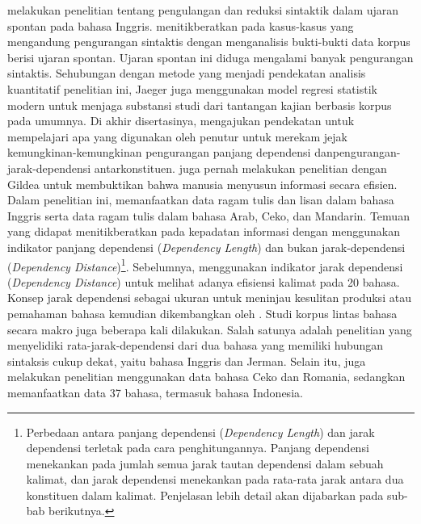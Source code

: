 \cite{jaeger2006redundancy} melakukan penelitian tentang pengulangan dan reduksi sintaktik dalam ujaran spontan pada bahasa Inggris. \cite{jaeger2006redundancy} menitikberatkan pada kasus-kasus yang mengandung pengurangan sintaktis dengan menganalisis bukti-bukti data korpus berisi ujaran spontan. Ujaran spontan ini diduga mengalami banyak pengurangan sintaktis. Sehubungan dengan metode yang menjadi pendekatan analisis kuantitatif penelitian ini, Jaeger juga menggunakan model regresi statistik modern untuk menjaga substansi studi dari tantangan kajian berbasis korpus pada umumnya. Di akhir disertasinya, \cite{jaeger2006redundancy} mengajukan pendekatan untuk mempelajari apa yang digunakan oleh penutur untuk merekam jejak kemungkinan-kemungkinan pengurangan panjang dependensi dan\gls{pengurangan-jarak-dependensi} antarkonstituen. \cite{jaeger2006redundancy} juga pernah melakukan penelitian dengan Gildea \citep{gildea2015human} untuk membuktikan bahwa manusia menyusun informasi secara efisien. Dalam penelitian ini, \cite{gildea2015human} memanfaatkan data ragam tulis dan lisan dalam bahasa Inggris serta data ragam tulis dalam bahasa Arab, Ceko, dan Mandarin. Temuan yang didapat menitikberatkan pada kepadatan informasi dengan menggunakan indikator panjang dependensi (\textit{Dependency Length}) dan bukan \gls{jarak-dependensi} (\textit{Dependency Distance})\footnote{Perbedaan antara panjang dependensi (\textit{Dependency Length}) dan jarak dependensi terletak pada cara penghitungannya. Panjang dependensi menekankan pada jumlah semua jarak tautan dependensi dalam sebuah kalimat, dan jarak dependensi menekankan pada rata-rata jarak antara dua konstituen dalam kalimat. Penjelasan lebih detail akan dijabarkan pada sub-bab berikutnya.}. Sebelumnya, \cite{liu2008dependency} menggunakan indikator jarak dependensi (\textit{Dependency Distance}) untuk melihat adanya efisiensi kalimat pada 20 bahasa. Konsep jarak dependensi sebagai ukuran untuk meninjau kesulitan produksi atau pemahaman bahasa kemudian dikembangkan oleh \cite{liu2017dependency}. Studi korpus lintas bahasa secara makro juga beberapa kali dilakukan. Salah satunya adalah penelitian \cite{gildea2010grammars} yang menyelidiki \gls{rata-jarak-dependensi} dari dua bahasa yang memiliki hubungan sintaksis cukup dekat, yaitu bahasa Inggris dan Jerman. Selain itu, \cite{i2004euclidean} juga melakukan penelitian menggunakan data bahasa Ceko dan Romania, sedangkan \cite{futrell2015large} memanfaatkan data 37 bahasa, termasuk bahasa Indonesia.

